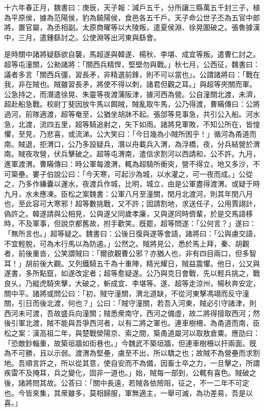 \begin{pinyinscope}
十六年春正月，魏書曰：庚辰，天子報：減戶五千，分所讓三縣萬五千封三子，植為平原侯，據為范陽侯，豹為饒陽侯，食邑各五千戶。天子命公世子丕為五官中郎將，置官屬，為丞相副。太原商曜等以大陵叛，遣夏侯淵、徐晃圍破之。張魯據漢中，三月，遣鍾繇討之。公使淵等出河東與繇會。

是時關中諸將疑繇欲自襲，馬超遂與韓遂、楊秋、李堪、成宜等叛。遣曹仁討之。超等屯潼關，公勑諸將：「關西兵精悍，堅壁勿與戰。」秋七月，公西征，魏書曰：議者多言「關西兵彊，習長矛，非精選前鋒，則不可以當也」。公謂諸將曰：「戰在我，非在賊也。賊雖習長矛，將使不得以刺，諸君但觀之耳。」與超等夾關而軍。公急持之，而潛遣徐晃、朱靈等夜渡蒲阪津，據河西為營。公自潼關北渡，未濟，超赴船急戰。校尉丁斐因放牛馬以餌賊，賊亂取牛馬，公乃得渡，曹瞞傳曰：公將過河，前隊適渡，超等奄至，公猶坐胡牀不起。張郃等見事急，共引公入船。河水急，北渡，流四五里，超等騎追射之，矢下如雨。諸將見軍敗，不知公所在，皆惶懼，至見，乃悲喜，或流涕。公大笑曰：「今日幾為小賊所困乎！」循河為甬道而南。賊退，拒渭口，公乃多設疑兵，潛以舟載兵入渭，為浮橋，夜，分兵結營於渭南。賊夜攻營，伏兵擊破之。超等屯渭南，遣信求割河以西請和，公不許。九月，進軍渡渭。曹瞞傳曰：時公軍每渡渭，輒為超騎所衝突，營不得立，地又多沙，不可築壘。婁子伯說公曰：「今天寒，可起沙為城，以水灌之，可一夜而成。」公從之，乃多作縑囊以運水，夜渡兵作城，比明，城立，由是公軍盡得渡渭。或疑于時九月，水未應凍。臣松之案魏書：公軍八月至潼關，閏月北渡河，則其年閏八月也，至此容可大寒邪！超等數挑戰，又不許；固請割地，求送任子，公用賈詡計，偽許之。韓遂請與公相見，公與遂父同歲孝廉，又與遂同時儕輩，於是交馬語移時，不及軍事，但說京都舊故，拊手歡笑。旣罷，超等問遂：「公何言？」遂曰：「無所言也。」超等疑之。魏書曰：公後日復與遂等會語，諸將曰：「公與虜交語，不宜輕脫，可為木行馬以為防遏。」公然之。賊將見公，悉於馬上拜，秦、胡觀者，前後重沓，公笑謂賊曰：「爾欲觀曹公邪？亦猶人也，非有四目兩口，但多智耳！」胡前後大觀。又列鐵騎五千為十重陣，精光耀日，賊益震懼。他日，公又與遂書，多所點竄，如遂改定者；超等愈疑遂。公乃與克日會戰，先以輕兵挑之，戰良乆，乃縱虎騎夾擊，大破之，斬成宜、李堪等。遂、超等走涼州，楊秋奔安定，關中平。諸將或問公曰：「初，賊守潼關，渭北道缺，不從河東擊馮翊而反守潼關，引日而後北渡，何也？」公曰：「賊守潼關，若吾入河東，賊必引守諸津，則西河未可渡，吾故盛兵向潼關；賊悉衆南守，西河之備虛，故二將得擅取西河；然後引軍北渡，賊不能與吾爭西河者，以有二將之軍也。連車樹柵，為甬道而南，臣松之案：漢高祖二年，與楚戰滎陽京、索之間，築甬道屬河以取敖倉粟。應劭曰：「恐敵鈔輜重，故築垣牆如街巷也。」今魏武不築垣牆，但連車樹柵以扞兩面。旣為不可勝，且以示弱。渡渭為堅壘，虜至不出，所以驕之也；故賊不為營壘而求割地。吾順言許之，所以從其意，使自安而不為備，因畜士卒之力，一旦擊之，所謂疾雷不及掩耳，兵之變化，固非一道也。」始，賊每一部到，公輒有喜色。賊破之後，諸將問其故。公荅曰：「關中長遠，若賊各依險阻，征之，不一二年不可定也。今皆來集，其衆雖多，莫相歸服，軍無適主，一舉可滅，為功差易，吾是以喜。」


\end{pinyinscope}
